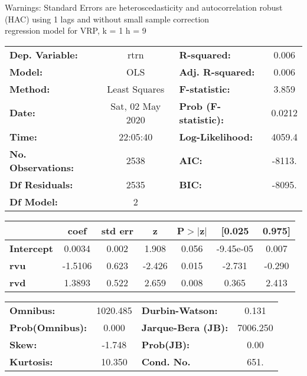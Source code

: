 Warnings: \newline
 [1] Standard Errors are heteroscedasticity and autocorrelation robust (HAC) using 1 lags and without small sample correction\\ 

regression model for VRP, k = 1 h = 9\begin{center}
\begin{tabular}{lclc}
\toprule
\textbf{Dep. Variable:}    &       rtrn       & \textbf{  R-squared:         } &     0.006   \\
\textbf{Model:}            &       OLS        & \textbf{  Adj. R-squared:    } &     0.006   \\
\textbf{Method:}           &  Least Squares   & \textbf{  F-statistic:       } &     3.859   \\
\textbf{Date:}             & Sat, 02 May 2020 & \textbf{  Prob (F-statistic):} &   0.0212    \\
\textbf{Time:}             &     22:05:40     & \textbf{  Log-Likelihood:    } &    4059.4   \\
\textbf{No. Observations:} &        2538      & \textbf{  AIC:               } &    -8113.   \\
\textbf{Df Residuals:}     &        2535      & \textbf{  BIC:               } &    -8095.   \\
\textbf{Df Model:}         &           2      & \textbf{                     } &             \\
\bottomrule
\end{tabular}
\begin{tabular}{lcccccc}
                   & \textbf{coef} & \textbf{std err} & \textbf{z} & \textbf{P$> |$z$|$} & \textbf{[0.025} & \textbf{0.975]}  \\
\midrule
\textbf{Intercept} &       0.0034  &        0.002     &     1.908  &         0.056        &    -9.45e-05    &        0.007     \\
\textbf{rvu}       &      -1.5106  &        0.623     &    -2.426  &         0.015        &       -2.731    &       -0.290     \\
\textbf{rvd}       &       1.3893  &        0.522     &     2.659  &         0.008        &        0.365    &        2.413     \\
\bottomrule
\end{tabular}
\begin{tabular}{lclc}
\textbf{Omnibus:}       & 1020.485 & \textbf{  Durbin-Watson:     } &    0.131  \\
\textbf{Prob(Omnibus):} &   0.000  & \textbf{  Jarque-Bera (JB):  } & 7006.250  \\
\textbf{Skew:}          &  -1.748  & \textbf{  Prob(JB):          } &     0.00  \\
\textbf{Kurtosis:}      &  10.350  & \textbf{  Cond. No.          } &     651.  \\
\bottomrule
\end{tabular}
\end{center}

